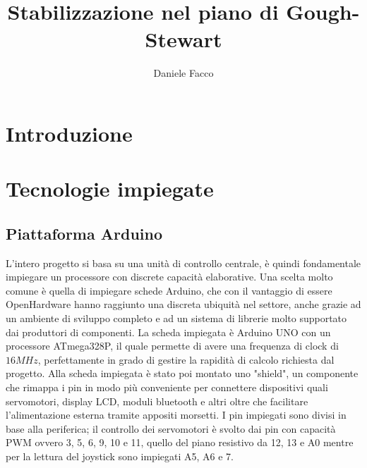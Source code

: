 \documentclass[12pt,twoside,openright]{article}
\title{Stabilizzazione nel piano di Gough-Stewart}
\author{Daniele Facco}
\date{}
\begin{document}
  \begin{frontespizio}
  \end{frontespizio}

\newpage
\tableofcontents
\newpage


\section{Introduzione}\label{intro}


\section{Tecnologie impiegate}\label{tecnologie}

\subsection{Piattaforma Arduino}\label{arduino}
L'intero progetto si basa su una unità di controllo centrale, è quindi fondamentale impiegare un processore con discrete capacità elaborative. Una scelta molto comune è quella di impiegare schede Arduino, che con il vantaggio di essere OpenHardware hanno raggiunto una discreta ubiquità nel settore, anche grazie ad un ambiente di sviluppo completo e ad un sistema di librerie molto supportato dai produttori di componenti. La scheda impiegata è Arduino UNO con un processore ATmega328P, il quale permette di avere una frequenza di clock di $16MHz$, perfettamente in grado di gestire la rapidità di calcolo richiesta dal progetto. Alla scheda impiegata è stato poi montato uno "shield", un componente che rimappa i pin in modo più conveniente per connettere dispositivi quali servomotori, display LCD, moduli bluetooth e altri oltre che facilitare l'alimentazione esterna tramite appositi morsetti. I pin impiegati sono divisi in base alla periferica; il controllo dei servomotori è svolto dai pin con capacità PWM ovvero 3, 5, 6, 9, 10 e 11, quello del piano resistivo da 12, 13 e A0 mentre per la lettura del joystick sono impiegati A5, A6 e 7.
\end{document}
